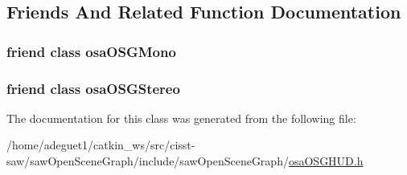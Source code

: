 \subsection{Friends And Related Function Documentation}
\hypertarget{classosa_o_s_g_h_u_d_a634b1c90f4ef3f117b24b0dca82f81b9}{
\subsubsection[{osa\-O\-S\-G\-Mono}]{\setlength{\rightskip}{0pt plus 5cm}friend class {\bf osa\-O\-S\-G\-Mono}\hspace{0.3cm}{\ttfamily [friend]}}}\label{classosa_o_s_g_h_u_d_a634b1c90f4ef3f117b24b0dca82f81b9}
\hypertarget{classosa_o_s_g_h_u_d_a579b6ba3b0d1fba394d73937c399dc67}{
\subsubsection[{osa\-O\-S\-G\-Stereo}]{\setlength{\rightskip}{0pt plus 5cm}friend class {\bf osa\-O\-S\-G\-Stereo}\hspace{0.3cm}{\ttfamily [friend]}}}\label{classosa_o_s_g_h_u_d_a579b6ba3b0d1fba394d73937c399dc67}


The documentation for this class was generated from the following file\-:\begin{DoxyCompactItemize}
\item 
/home/adeguet1/catkin\-\_\-ws/src/cisst-\/saw/saw\-Open\-Scene\-Graph/include/saw\-Open\-Scene\-Graph/\hyperlink{osa_o_s_g_h_u_d_8h}{osa\-O\-S\-G\-H\-U\-D.\-h}\end{DoxyCompactItemize}
